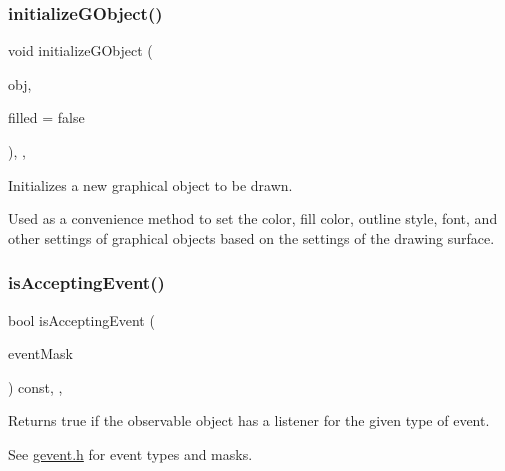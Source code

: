 \subsubsection{\texorpdfstring{initialize\+G\+Object()}{initializeGObject()}\hspace{0.1cm}{\footnotesize\ttfamily [2/2]}}
{\footnotesize\ttfamily void initialize\+G\+Object (\begin{DoxyParamCaption}\item[{\mbox{\hyperlink{classGObject}{G\+Object}} $\ast$}]{obj,  }\item[{bool}]{filled = {\ttfamily false} }\end{DoxyParamCaption})\hspace{0.3cm}{\ttfamily [protected]}, {\ttfamily [virtual]}, {\ttfamily [inherited]}}



Initializes a new graphical object to be drawn. 

Used as a convenience method to set the color, fill color, outline style, font, and other settings of graphical objects based on the settings of the drawing surface. \mbox{\label{classGObservable_aeec1adc19aa0f33de62390686ee1382c}} 
\subsubsection{\texorpdfstring{is\+Accepting\+Event()}{isAcceptingEvent()}\hspace{0.1cm}{\footnotesize\ttfamily [1/3]}}
{\footnotesize\ttfamily bool is\+Accepting\+Event (\begin{DoxyParamCaption}\item[{int}]{event\+Mask }\end{DoxyParamCaption}) const\hspace{0.3cm}{\ttfamily [protected]}, {\ttfamily [virtual]}, {\ttfamily [inherited]}}



Returns true if the observable object has a listener for the given type of event. 

See \mbox{\hyperlink{gevent_8h_source}{gevent.\+h}} for event types and masks. \mbox{\label{classGObservable_aa31c73145a29dcb92848a92e0cfaea41}} 
